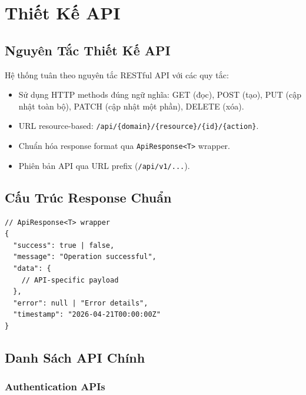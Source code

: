 \documentclass[12pt, a4paper]{report}
\begin{document}
\chapter{Thiết Kế API}

\section{Nguyên Tắc Thiết Kế API}

Hệ thống tuân theo nguyên tắc RESTful API với các quy tắc:
\begin{itemize}
    \item Sử dụng HTTP methods đúng ngữ nghĩa: GET (đọc), POST (tạo), PUT (cập nhật toàn bộ), PATCH (cập nhật một phần), DELETE (xóa).
    \item URL resource-based: \texttt{/api/\{domain\}/\{resource\}/\{id\}/\{action\}}.
    \item Chuẩn hóa response format qua \texttt{ApiResponse<T>} wrapper.
    \item Phiên bản API qua URL prefix (\texttt{/api/v1/...}).
\end{itemize}

\section{Cấu Trúc Response Chuẩn}

\begin{lstlisting}[style=javastyle]
// ApiResponse<T> wrapper
{
  "success": true | false,
  "message": "Operation successful",
  "data": {
    // API-specific payload
  },
  "error": null | "Error details",
  "timestamp": "2026-04-21T00:00:00Z"
}
\end{lstlisting}

\section{Danh Sách API Chính}

\subsection{Authentication APIs}
\end{document}
